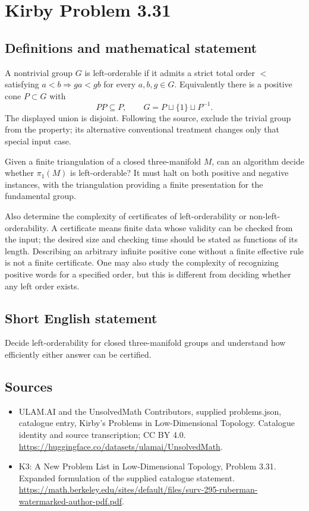 \documentclass[11pt,a4paper]{article}
\begin{document}
\section*{Kirby Problem 3.31}\label{statement}

\subsection{Definitions and mathematical statement}
A nontrivial group $G$ is left-orderable if it admits a strict total order
$<$ satisfying $a<b\Rightarrow ga<gb$ for every $a,b,g\in G$. Equivalently
there is a positive cone $P\subset G$ with
\[
 PP\subseteq P,\qquad G=P\sqcup\{1\}\sqcup P^{-1}.
\]
The displayed union is disjoint. Following the source, exclude the trivial
group from the property; its alternative conventional treatment changes
only that special input case.

Given a finite triangulation of a closed three-manifold $M$, can an algorithm
decide whether $\pi_1(M)$ is left-orderable? It must halt on both positive
and negative instances, with the triangulation providing a finite presentation
for the fundamental group.

Also determine the complexity of certificates of left-orderability or
non-left-orderability. A certificate means finite data whose validity can be
checked from the input; the desired size and checking time should be stated
as functions of its length. Describing an arbitrary infinite positive cone
without a finite effective rule is not a finite certificate. One may also
study the complexity of recognizing positive words for a specified order,
but this is different from deciding whether any left order exists.
\subsection{Short English statement}
Decide left-orderability for closed three-manifold groups and understand how efficiently either answer can be certified.
\subsection{Sources}
\begin{itemize}
\item[S1] ULAM.AI and the UnsolvedMath Contributors, supplied problems.json, catalogue entry, Kirby's Problems in Low-Dimensional Topology. Catalogue identity and source transcription; CC BY 4.0.
\url{https://huggingface.co/datasets/ulamai/UnsolvedMath}.
\item[S2] K3: A New Problem List in Low-Dimensional Topology, Problem 3.31. Expanded formulation of the supplied catalogue statement.
\url{https://math.berkeley.edu/sites/default/files/surv-295-ruberman-watermarked-author-pdf.pdf}.
\end{itemize}
\end{document}
